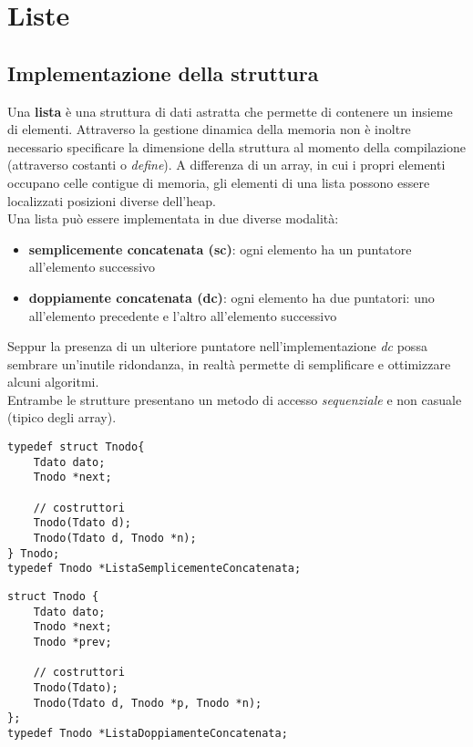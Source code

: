 \chapter{Liste}
\section{Implementazione della struttura}
Una \textbf{lista} è una struttura di dati astratta che permette di contenere un insieme di elementi. Attraverso la gestione dinamica della memoria non è inoltre necessario specificare la dimensione della struttura al momento della compilazione (attraverso costanti o \textit{define}). A differenza di un array, in cui i propri elementi occupano celle contigue di memoria, gli elementi di una lista possono essere localizzati posizioni diverse dell'heap.\\
Una lista può essere implementata in due diverse modalità:
\begin{itemize}
	\item \textbf{semplicemente concatenata (sc)}: ogni elemento ha un puntatore all'elemento successivo
	\item \textbf{doppiamente concatenata (dc)}: ogni elemento ha due puntatori: uno all'elemento precedente e l'altro all'elemento successivo
\end{itemize}

Seppur la presenza di un ulteriore puntatore nell'implementazione \textit{dc} possa sembrare un'inutile ridondanza, in realtà permette di semplificare e ottimizzare alcuni algoritmi.\\
Entrambe le strutture presentano un metodo di accesso \textit{sequenziale} e non casuale (tipico degli array).

\begin{lstlisting}[title={Implementazione lista singolarmente concatenata}]
typedef struct Tnodo{
    Tdato dato;
    Tnodo *next;

    // costruttori
    Tnodo(Tdato d);
    Tnodo(Tdato d, Tnodo *n);
} Tnodo;
typedef Tnodo *ListaSemplicementeConcatenata;
\end{lstlisting}

\begin{lstlisting}[title={Implementazione lista doppiamente concatenata}]
struct Tnodo {
    Tdato dato;
    Tnodo *next;
    Tnodo *prev;
    
    // costruttori
    Tnodo(Tdato);
    Tnodo(Tdato d, Tnodo *p, Tnodo *n);
};
typedef Tnodo *ListaDoppiamenteConcatenata;
\end{lstlisting}

